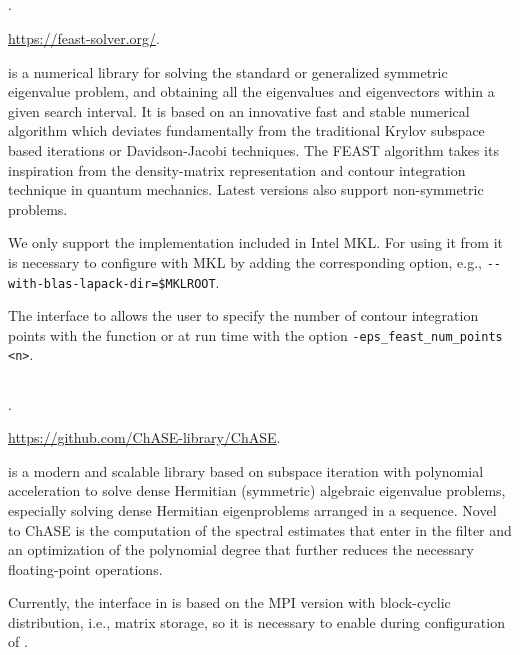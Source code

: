 \subsection*{\underline{\feast}}
\begin{description}
\setlength{\itemsep}{0pt}
\item[References.]\citep{Polizzi:2009:DAS}.
\item[Website.] \url{https://feast-solver.org/}.
\item[Summary.] \feast is a numerical library for solving the standard or generalized symmetric eigenvalue problem, and obtaining all the eigenvalues and eigenvectors within a given search interval. It is based on an innovative fast and stable numerical algorithm which deviates fundamentally from the traditional Krylov subspace based iterations or Davidson-Jacobi techniques. The FEAST algorithm takes its inspiration from the density-matrix representation and contour integration technique in quantum mechanics. Latest versions also support non-symmetric problems.
\item[Installation.] We only support the \feast implementation included in Intel MKL. For using it from \slepc it is necessary to configure \petsc with MKL by adding the corresponding option, e.g., \Verb!--with-blas-lapack-dir=$MKLROOT!.
\item[Specific options.] The \slepc interface to \feast allows the user to specify the number of contour integration points with the function  or at run time with the option \Verb!-eps_feast_num_points <n>!.
\end{description}

\subsection*{\underline{\chase}}
\begin{description}
\setlength{\itemsep}{0pt}
\item[References.]\citep{Winkelmann:2019:CCA}.
\item[Website.] \url{https://github.com/ChASE-library/ChASE}.
\item[Summary.] \chase is a modern and scalable library based on subspace iteration with polynomial acceleration to solve dense Hermitian (symmetric) algebraic eigenvalue problems, especially solving dense Hermitian eigenproblems arranged in a sequence. Novel to ChASE is the computation of the spectral estimates that enter in the filter and an optimization of the polynomial degree that further reduces the necessary floating-point operations.
\item[Installation.] Currently, the \chase interface in \slepc is based on the MPI version with block-cyclic distribution, i.e., \scalapack matrix storage, so it is necessary to enable \scalapack during configuration of \petsc.
\end{description}

